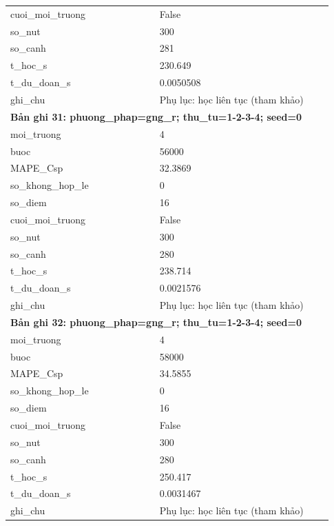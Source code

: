 \begin{longtable}{p{0.43\linewidth}p{0.50\linewidth}}
cuoi\_\allowbreak moi\_\allowbreak truong & False \\
so\_\allowbreak nut & 300 \\
so\_\allowbreak canh & 281 \\
t\_\allowbreak hoc\_\allowbreak s & 230.649 \\
t\_\allowbreak du\_\allowbreak doan\_\allowbreak s & 0.0050508 \\
ghi\_\allowbreak chu & Phụ lục: học liên tục (tham khảo) \\
\midrule
\multicolumn{2}{p{0.95\linewidth}}{\textbf{Bản ghi 31: phuong\_phap=gng\_r; thu\_tu=1-2-3-4; seed=0}} \\
moi\_\allowbreak truong & 4 \\
buoc & 56000 \\
MAPE\_\allowbreak Csp & 32.3869 \\
so\_\allowbreak khong\_\allowbreak hop\_\allowbreak le & 0 \\
so\_\allowbreak diem & 16 \\
cuoi\_\allowbreak moi\_\allowbreak truong & False \\
so\_\allowbreak nut & 300 \\
so\_\allowbreak canh & 280 \\
t\_\allowbreak hoc\_\allowbreak s & 238.714 \\
t\_\allowbreak du\_\allowbreak doan\_\allowbreak s & 0.0021576 \\
ghi\_\allowbreak chu & Phụ lục: học liên tục (tham khảo) \\
\midrule
\multicolumn{2}{p{0.95\linewidth}}{\textbf{Bản ghi 32: phuong\_phap=gng\_r; thu\_tu=1-2-3-4; seed=0}} \\
moi\_\allowbreak truong & 4 \\
buoc & 58000 \\
MAPE\_\allowbreak Csp & 34.5855 \\
so\_\allowbreak khong\_\allowbreak hop\_\allowbreak le & 0 \\
so\_\allowbreak diem & 16 \\
cuoi\_\allowbreak moi\_\allowbreak truong & False \\
so\_\allowbreak nut & 300 \\
so\_\allowbreak canh & 280 \\
t\_\allowbreak hoc\_\allowbreak s & 250.417 \\
t\_\allowbreak du\_\allowbreak doan\_\allowbreak s & 0.0031467 \\
ghi\_\allowbreak chu & Phụ lục: học liên tục (tham khảo) \\

\end{longtable}

